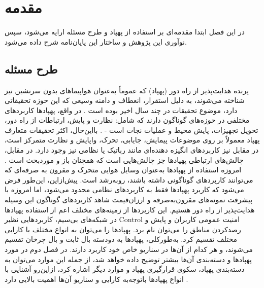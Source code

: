 \chapter{مقدمه}
در این فصل ابتدا مقدمه‌ای بر استفاده از پهپاد و طرح مسئله ارایه می‌شود، سپس نو‌آوری این پژوهش و ساختار این پایان‌نامه شرح داده می‌شود.
\section{طرح مسئله}
پرنده هدایت‌پذیر از راه دور (پهپاد) که عموماً به‌عنوان هواپیماهای بدون سرنشین نیز شناخته می‌شوند، به دلیل استقرار، انعطاف و دامنه وسیعی که این حوزه تحقیقاتی دارد، موضوع تحقیقات در چند سال اخیر بوده است \cite{7317490}.
در واقع، پهپادها کاربردهای مختلفی در حوزه‌های گوناگون دارند که شامل: نظارت و پایش، ارتباطات از راه دور، تحویل تجهیزات، پایش محیط و عملیات نجات است \cite{yanmaz2018drone} - \cite{9419470}. بااین‌حال، اکثر تحقیقات متعارف پهپاد معمولاً بر روی موضوعات پیمایش، جایابی، تحرک، واپایش و نظارت متمرکز است، در مقابل نیز کاربردهای انگیزه دهنده‌ای مانند رباتیک یا نظامی نیز وجود دارد. در مقابل، چالش‌های ارتباطی پهپادها جز چالش‌هایی است که همچنان باز و موردبحث است \cite{nawaz2021uav}.
امروزه استفاده از پهپادها به‌عنوان وسایل هوایی متحرک و مقرون به صرفه‌ای که می‌توانند کاربردهای گوناگونی داشته باشند، روبه‌رشد است. پیش‌ازاین، این‌طور فرض می‌شود که کاربرد پهپادها فقط به کاربردهای نظامی محدود می‌شود، اما امروزه با پیشرفت نمونه‌های مقرون‌به‌صرفه و ارزان‌قیمت شاهد کاربردهای گوناگون این وسیله هدایت‌پذیر از راه دور هستیم. این کاربردها از زمینه‌های مختلف اعم از استفاده پهپادها در شبکه‌های بی‌سیم، کاربردهایی نظیر \gls{Control} امنیت عمومی کاربران و پایش و رصدکردن مناطق را می‌توان نام برد. پهپادها را می‌توان به انواع مختلف با کارایی مختلف تقسیم کرد. به‌طورکلی، پهپادها به دودسته بال ثابت و بال چرخان تقسیم می‌شوند، و هر کدام از آن‌ها در سناریو خاص خود کاربرد دارند. در فصل دوم در مورد پهپادها و دسته‌بندی آن‌ها بیشتر توضیح داده خواهد شد، از جمله این موارد می‌توان به دسته‌بندی پهپاد، سکوی قرارگیری پهپاد و موارد دیگر اشاره کرد، ازاین‌رو آشنایی با انواع پهپادها باتوجه‌به کارایی و سناریو آن‌ها اهمیت بالایی دارد \cite{mozaffari2019tutorial}.

